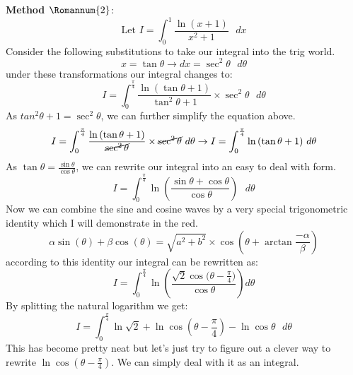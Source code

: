 \documentclass{article}
\begin{document}
\newpage
\textbf{Method $\Romannum{2}$}:
\begin{equation}
    \text{Let } I = \int_{0}^{1}\frac{\ln{(x+1)}}{x^{2}+1} \text{ $dx$} \nonumber
\end{equation}
Consider the following substitutions to take our integral into the trig world.
\begin{equation}
    x = \tan{\theta} \to \text{$dx$} = \sec^{2}{\theta}\text{ $d\theta$}\nonumber
\end{equation}
under these transformations our integral changes to:
\begin{equation}
    I = \int_{0}^{\frac{\pi}{4}} \frac{\ln{(\tan\theta + 1)}}{\tan^{2}\theta+1}\times \sec^{2}{\theta}\text{ $d\theta$}\nonumber
\end{equation}
As $tan^{2}\theta + 1 = \sec^{2}\theta$, we can further simplify the equation above.
\begin{equation}
    I = \int_{0}^{\frac{\pi}{4}} \frac{\ln{(\tan\theta + 1)}}{\cancel{\sec^{2}{\theta}}}\times \cancel{\sec^{2}{\theta}}\text{ $d\theta$}\nonumber \to  I = \int_{0}^{\frac{\pi}{4}} \ln{(\tan\theta + 1)}\text{ $d\theta$}
\end{equation}
As $\tan{\theta} = \frac{\sin{\theta}}{\cos{\theta}}$, we can rewrite our integral into an easy to deal with form.
\begin{equation}
     I = \int_{0}^{\frac{\pi}{4}} \ln\left({\frac{\sin{\theta+\cos{\theta}}}{\cos{\theta}}}\right)\text{ $d\theta$}\nonumber
\end{equation}
Now we can combine the sine and cosine waves by a very special trigonometric identity which I will demonstrate in the red.
\begin{equation}
    \alpha\sin{(\theta)} + \beta\cos{(\theta)} = \sqrt{a^{2}+b^{2}}\times \cos\left(\theta + \arctan{\frac{-\alpha}{\beta}}\right)\nonumber
\end{equation}
according to this identity our integral can be rewritten as:
\begin{equation}
    I = \int_{0}^{\frac{\pi}{4}}\ln\left({\frac{\sqrt{2}\cos{(\theta-\frac{\pi}{4}})}{\cos{\theta}}}\right)\text{$d\theta$}\nonumber
\end{equation}
By splitting the natural logarithm we get:
\begin{equation}
I = \int_{0}^{\frac{\pi}{4}}\ln{\sqrt{2}+\ln{\cos\left(\theta-\frac{\pi}{4}\right)}} - \ln{\cos{\theta}} \text{ $d\theta$} 
\end{equation}
\newpage
This has become pretty neat but let's just try to figure out a clever way to rewrite $\ln\cos\left(\theta-\frac{\pi}{4}\right)$. We can simply deal with it as an integral.
\end{document}

